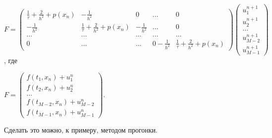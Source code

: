 \documentclass[14pt,a4paper]{extarticle}
\newcommand{\1}{\mathbbm{1}}
\begin{document}
$F = \begin{pmatrix}
    \frac{1}{\tau} + \frac{2}{h^2} + p(x_n)  &   -\frac{1}{h^2}                           & 0               & \ldots & 0 \\
    -\frac{1}{h^2}                           &   \frac{1}{\tau} + \frac{2}{h^2} + p(x_n)  & -\frac{1}{h^2}  & \ldots & 0  \\
    \ldots  &\ldots  &   \ldots  & \ldots  & \ldots \\
    0 & \ldots & \ldots & 0 -\frac{1}{h^2}  &   \frac{1}{\tau} + \frac{2}{h^2} + p(x_n) 
\end{pmatrix}
\begin{pmatrix}
    u_1^{n + 1} \\
    u_2^{n + 1} \\
    \ldots \\
    u_{M-2}^{n+1} \\
    u_{M-1}^{n+1}
\end{pmatrix}$, 
где

$F=
\begin{pmatrix}
    f(t_{1}, x_n) + u_1^{n} \\
    f(t_{2}, x_n) + u_2^{n} \\
    \ldots \\
    f(t_{M-2}, x_n) + u_{M-2}^{n} \\
    f(t_{M-1}, x_n) + u_{M-1}^{n}
\end{pmatrix}$.



Сделать это можно, к примеру, методом прогонки.
\end{document}

